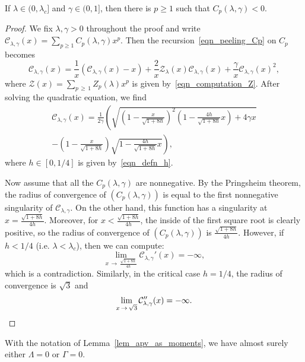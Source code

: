 \documentclass[AHL,Unicode,longabstracts,published]{cedram}
\newcommand{\clZ}{\mathcal{Z}}
\newcommand{\clC}{\mathcal{C}}
\begin{document}
\begin{prop}\label{prop_cnegative_deterministic}
If $\lambda \in (0,\lambda_c]$ and $\gamma \in (0,1]$, then there is $p \geq 1$ such that $C_p(\lambda,\gamma) <0$.
\end{prop}

\begin{proof}
We fix $\lambda, \gamma>0$ throughout the proof and write $\clC_{\lambda, \gamma}(x)=\sum_{p \geq 1} C_p(\lambda,\gamma) x^p$. Then the recursion~\eqref{eqn_peeling_Cp} on $C_p$ becomes
\begin{equation}\label{eqn_genfunction_Cp}
\clC_{\lambda, \gamma}(x)=\frac{1}{x} \left(\clC_{\lambda, \gamma}(x)-x \right) + \frac{2}{x} \clZ_{\lambda}(x) \clC_{\lambda, \gamma}(x) + \frac{\gamma}{x} \clC_{\lambda, \gamma}(x)^2,
\end{equation}
where $\clZ(x)=\sum_{p\,\geq\,1} Z_p(\lambda) x^p$ is given by~\eqref{eqn_computation_Z}. After solving the quadratic equation, we find
\begin{multline}
\clC_{\lambda, \gamma}(x)=\frac{1}{2\gamma} \left(\sqrt{\left(1-\frac{x}{\sqrt{1+8h}} \right)^2 \left(1-\frac{4h}{\sqrt{1+8h}}x \right) +4\gamma x}\right.\\ 
\left. -\left(1-\frac{x}{\sqrt{1+8h}} \right) \sqrt{1-\frac{4h}{\sqrt{1+8h}}x} \right),
\end{multline}
where $h \in [0,1/4]$ is given by~\eqref{eqn_defn_h}.

Now assume that all the $C_p(\lambda, \gamma)$ are nonnegative. By the Pringsheim theorem, the radius of convergence of $(C_p(\lambda,\gamma))$ is equal to the first nonnegative singularity of $\clC_{\lambda,\gamma}$. On the other hand, this function has a singularity at $x=\frac{\sqrt{1+8h}}{4h}$. Moreover, for $x < \frac{\sqrt{1+8h}}{4h}$, the inside of the first square root is clearly positive, so the radius of convergence of $(C_p(\lambda, \gamma) )$ is $\frac{\sqrt{1+8h}}{4h}$. However, if $h<1/4$ (i.e. $\lambda<\lambda_c$), then we can compute:
\[
\lim_{x\,\to\,\frac{\sqrt{1+8h}}{4h}} \clC_{\lambda,\gamma}'(x) = -\infty,
\]
which is a contradiction. Similarly, in the critical case $h=1/4$, the radius of convergence is $\sqrt{3}$ and
\[
\lim_{x\,\to\,\sqrt{3}} \clC_{\lambda,\gamma}''(x) = -\infty.\qedhere
\]
\end{proof}

\begin{prop}\label{prop_cnegative_random}
With the notation of Lemma~\ref{lem_apv_as_moments}, we have almost surely either $\Lambda=0$ or $\Gamma=0$.
\end{prop}
\end{document}
